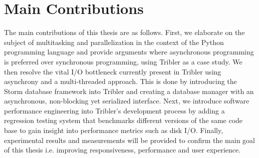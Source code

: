 \section{Main Contributions}
The main contributions of this thesis are as follows.
First, we elaborate on the subject of multitasking and parallelization in the context of the Python programming language and provide arguments where asynchronous programming is preferred over synchronous programming, using Tribler as a case study.
We then resolve the vital I/O bottleneck currently present in Tribler using asynchrony and a multi-threaded approach.
This is done by introducing the Storm database framework into Tribler and creating a database manager with an asynchronous, non-blocking yet serialized interface.
Next, we introduce software performance engineering into Tribler's development process by adding a regression testing system that benchmarks different versions of the same code base to gain insight into performance metrics such as disk I/O.
Finally, experimental results and measurements will be provided to confirm the main goal of this thesis i.e. improving responsiveness, performance and user experience.
